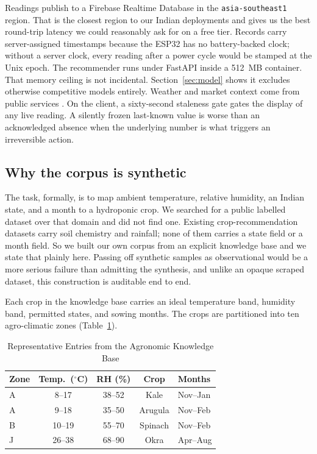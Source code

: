 \documentclass[conference]{IEEEtran}
\begin{document}
Readings publish to a Firebase Realtime Database in the
\texttt{asia-southeast1} region. That is the closest region to our Indian
deployments and gives us the best round-trip latency we could reasonably ask
for on a free tier. Records carry server-assigned timestamps because the
ESP32 has no battery-backed clock; without a server clock, every reading
after a power cycle would be stamped at the Unix epoch. The recommender runs
under FastAPI inside a 512~MB container. That memory ceiling is not
incidental. Section~\ref{sec:model} shows it excludes otherwise competitive
models entirely. Weather and market context come from public services
\cite{openmeteo,agmarknet}. On the client, a sixty-second staleness gate
gates the display of any live reading. A silently frozen last-known value is
worse than an acknowledged absence when the underlying number is what
triggers an irreversible action.

\subsection{Why the corpus is synthetic}
The task, formally, is to map ambient temperature, relative humidity, an
Indian state, and a month to a hydroponic crop. We searched for a public
labelled dataset over that domain and did not find one. Existing
crop-recommendation datasets carry soil chemistry and rainfall; none of them
carries a state field or a month field. So we built our own corpus from an
explicit knowledge base and we state that plainly here. Passing off
synthetic samples as observational would be a more serious failure than
admitting the synthesis, and unlike an opaque scraped dataset, this
construction is auditable end to end.

Each crop in the knowledge base carries an ideal temperature band, humidity
band, permitted states, and sowing months. The crops are partitioned into
ten agro-climatic zones (Table~\ref{tab:zones}).

\begin{table}[!t]
\caption{Representative Entries from the Agronomic Knowledge Base}
\label{tab:zones}
\centering
\footnotesize
\begin{tabular}{@{}lcccl@{}}
\toprule
\textbf{Zone} & \textbf{Temp.\ ($^{\circ}$C)} & \textbf{RH (\%)} & \textbf{Crop} & \textbf{Months} \\
\midrule
A & 8--17  & 38--52 & Kale    & Nov--Jan \\
A & 9--18  & 35--50 & Arugula & Nov--Feb \\
B & 10--19 & 55--70 & Spinach & Nov--Feb \\
J & 26--38 & 68--90 & Okra    & Apr--Aug \\
\bottomrule
\end{tabular}
\end{table}
\end{document}
